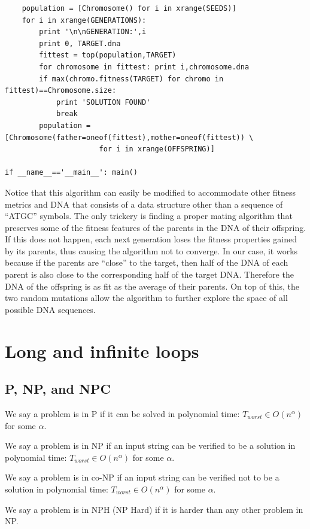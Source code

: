 \documentclass[justified,sixbynine]{tufte-book}
\theoremstyle{plain}%
\theoremstyle{definition}
\theoremstyle{remark}
\begin{document}
\begin{fullwidth}
\begin{lstlisting}
    population = [Chromosome() for i in xrange(SEEDS)]
    for i in xrange(GENERATIONS):
        print '\n\nGENERATION:',i
        print 0, TARGET.dna
        fittest = top(population,TARGET)
        for chromosome in fittest: print i,chromosome.dna
        if max(chromo.fitness(TARGET) for chromo in fittest)==Chromosome.size:
            print 'SOLUTION FOUND'
            break
        population = [Chromosome(father=oneof(fittest),mother=oneof(fittest)) \
                      for i in xrange(OFFSPRING)]

if __name__=='__main__': main()
\end{lstlisting}

Notice that this algorithm can easily be modified to accommodate other fitness metrics and DNA that consists of a data structure other than a sequence of ``ATGC'' symbols. The only trickery is finding a proper mating algorithm that preserves some of the fitness features of the parents in the DNA of their offspring. If this does not happen, each next generation loses the fitness properties gained by its parents, thus causing the algorithm not to converge. In our case, it works because if the parents are ``close'' to the target, then half of the DNA of each parent is also close to the corresponding half of the target DNA. Therefore the DNA of the offspring is as fit as the average of their parents. On top of this, the two random mutations allow the algorithm to further explore the space of all possible DNA sequences.

\goodbreak\section{Long and infinite loops}
\goodbreak\subsection{P, NP, and NPC}

We say a problem is in P if it can be solved in polynomial time: $%
T_{worst}\in O(n^\alpha )$ for some $\alpha $.

We say a problem is in NP if an input string can be verified to be a
solution in polynomial time: $T_{worst}\in O(n^\alpha )$ for some $\alpha $.

We say a problem is in co-NP if an input string can be verified not to be a
solution in polynomial time: $T_{worst}\in O(n^\alpha )$ for some $\alpha $.

We say a problem is in NPH (NP Hard) if it is harder than any other problem
in NP.


\end{fullwidth}
\end{document}
